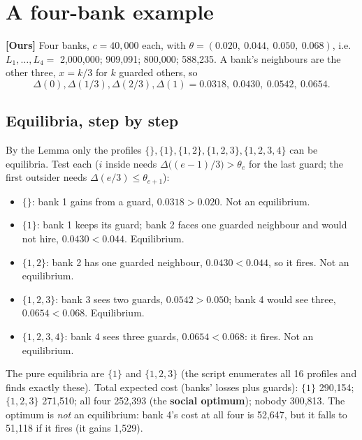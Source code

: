\documentclass[11pt,a4paper]{article}
\newcommand{\ours}{\textbf{[Ours]}}
\newcommand{\Dl}{\Delta}
\begin{document}
\section{A four-bank example}

\ours{} Four banks, $c=40{,}000$ each, with
$\theta=(0.020,\ 0.044,\ 0.050,\ 0.068)$, i.e.\ $L_1,\dots,L_4=$ 2,000,000; 909,091; 800,000; 588,235. A bank's neighbours are
the other three, $x=k/3$ for $k$ guarded others, so
\[
  \Dl(0),\Dl(1/3),\Dl(2/3),\Dl(1)=0.0318,\ 0.0430,\ 0.0542,\ 0.0654 .
\]

\subsection{Equilibria, step by step}
By the Lemma only the profiles $\{\},\{1\},\{1,2\},\{1,2,3\},\{1,2,3,4\}$ can be equilibria. Test each ($i$ inside needs
$\Dl\bigl((e-1)/3\bigr)>\theta_e$ for the last guard; the first outsider needs $\Dl(e/3)\le\theta_{e+1}$):
\begin{itemize}
  \item $\{\}$: bank 1 gains from a guard, $0.0318>0.020$. Not an equilibrium.
  \item $\{1\}$: bank 1 keeps its guard; bank 2 faces one guarded neighbour and would not hire, $0.0430<0.044$. Equilibrium.
  \item $\{1,2\}$: bank 2 has one guarded neighbour, $0.0430<0.044$, so it fires. Not an equilibrium.
  \item $\{1,2,3\}$: bank 3 sees two guards, $0.0542>0.050$; bank 4 would see three, $0.0654<0.068$. Equilibrium.
  \item $\{1,2,3,4\}$: bank 4 sees three guards, $0.0654<0.068$: it fires. Not an equilibrium.
\end{itemize}
The pure equilibria are $\{1\}$ and $\{1,2,3\}$ (the script enumerates all 16 profiles and finds exactly these).
Total expected cost (banks' losses plus guards): $\{1\}$ 290,154; $\{1,2,3\}$ 271,510; all four 252,393 (the
\textbf{social optimum}); nobody 300,813. The optimum is \emph{not} an equilibrium: bank 4's cost at all four is
52,647, but it falls to 51,118 if it fires (it gains 1,529).
\end{document}
